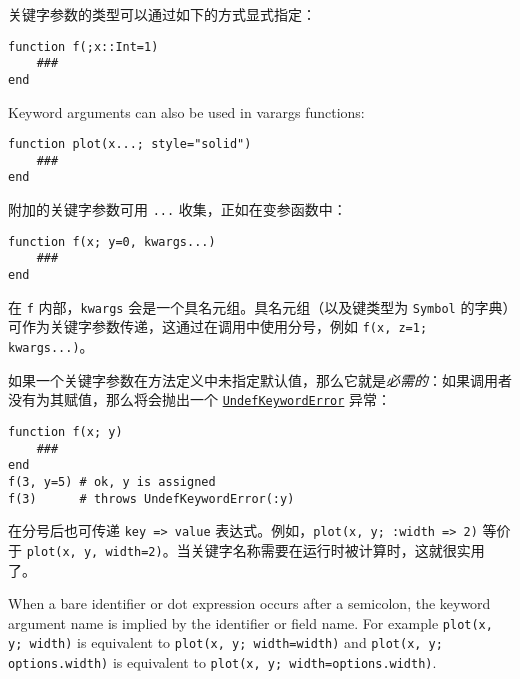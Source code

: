 关键字参数的类型可以通过如下的方式显式指定：




\begin{verbatim}
function f(;x::Int=1)
    ###
end
\end{verbatim}



Keyword arguments can also be used in varargs functions:




\begin{verbatim}
function plot(x...; style="solid")
    ###
end
\end{verbatim}



附加的关键字参数可用 \texttt{...} 收集，正如在变参函数中：




\begin{verbatim}
function f(x; y=0, kwargs...)
    ###
end
\end{verbatim}



在 \texttt{f} 内部，\texttt{kwargs} 会是一个具名元组。具名元组（以及键类型为 \texttt{Symbol} 的字典）可作为关键字参数传递，这通过在调用中使用分号，例如 \texttt{f(x, z=1; kwargs...)}。



如果一个关键字参数在方法定义中未指定默认值，那么它就是\emph{必需的}：如果调用者没有为其赋值，那么将会抛出一个 \hyperlink{14325831233857471256}{\texttt{UndefKeywordError}} 异常：




\begin{verbatim}
function f(x; y)
    ###
end
f(3, y=5) # ok, y is assigned
f(3)      # throws UndefKeywordError(:y)
\end{verbatim}



在分号后也可传递 \texttt{key => value} 表达式。例如，\texttt{plot(x, y; :width => 2)} 等价于 \texttt{plot(x, y, width=2)}。当关键字名称需要在运行时被计算时，这就很实用了。



When a bare identifier or dot expression occurs after a semicolon, the keyword argument name is implied by the identifier or field name. For example \texttt{plot(x, y; width)} is equivalent to \texttt{plot(x, y; width=width)} and \texttt{plot(x, y; options.width)} is equivalent to \texttt{plot(x, y; width=options.width)}.



